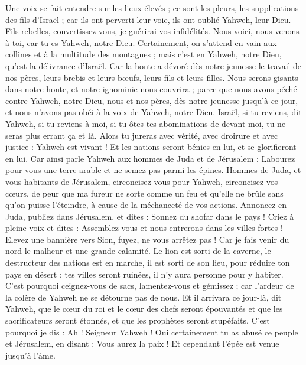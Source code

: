 \begin{multicols}{2}
Une voix se fait entendre sur les lieux élevés ; ce sont les pleurs, les supplications des fils d'Israël ; car ils ont perverti leur voie, ils ont oublié Yahweh, leur Dieu.
Fils rebelles, convertissez-vous, je guérirai vos infidélités. Nous voici, nous venons à toi, car tu es Yahweh, notre Dieu.
Certainement, on s'attend en vain aux collines et à la multitude des montagnes ; mais c'est en Yahweh, notre Dieu, qu'est la délivrance d'Israël.
Car la honte a dévoré dès notre jeunesse le travail de nos pères, leurs brebis et leurs bœufs, leurs fils et leurs filles.
Nous serons gisants dans notre honte, et notre ignominie nous couvrira ; parce que nous avons péché contre Yahweh, notre Dieu, nous et nos pères, dès notre jeunesse jusqu'à ce jour, et nous n'avons pas obéi à la voix de Yahweh, notre Dieu.
\VerseOne{}Israël, si tu reviens, dit Yahweh, si tu reviens à moi, si tu ôtes tes abominations de devant moi, tu ne seras plus errant ça et là.
Alors tu jureras avec vérité, avec droirure et avec justice : Yahweh est vivant ! Et les nations seront bénies en lui, et se glorifieront en lui.
Car ainsi parle Yahweh aux hommes de Juda et de Jérusalem : Labourez pour vous une terre arable et ne semez pas parmi les épines.
Hommes de Juda, et vous habitants de Jérusalem, circoncisez-vous pour Yahweh, circoncisez vos cœurs, de peur que ma fureur ne sorte comme un feu et qu'elle ne brûle sans qu'on puisse l'éteindre, à cause de la méchanceté de vos actions.
Annoncez en Juda, publiez dans Jérusalem, et dites : Sonnez du shofar dans le pays ! Criez à pleine voix et dites : Assemblez-vous et nous entrerons dans les villes fortes !
Elevez une bannière vers Sion, fuyez, ne vous arrêtez pas ! Car je fais venir du nord le malheur et une grande calamité.
Le lion est sorti de la caverne, le destructeur des nations est en marche, il est sorti de son lieu, pour réduire ton pays en désert ; tes villes seront ruinées, il n'y aura personne pour y habiter.
C'est pourquoi ceignez-vous de sacs, lamentez-vous et gémissez ; car l'ardeur de la colère de Yahweh ne se détourne pas de nous.
Et il arrivara ce jour-là, dit Yahweh, que le cœur du roi et le cœur des chefs seront épouvantés et que les sacrificateurs seront étonnés, et que les prophètes seront stupéfaits.
C'est pourquoi je dis : Ah ! Seigneur Yahweh ! Oui certainement tu as abusé ce peuple et Jérusalem, en disant : Vous aurez la paix ! Et cependant l'épée est venue jusqu'à l'âme.

\end{multicols}

